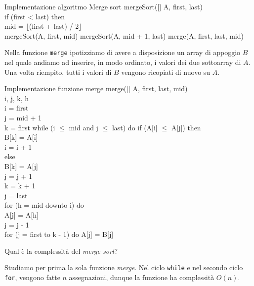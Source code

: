 \begin{code}{Implementazione algoritmo Merge sort}
\noindent\rmbreak\ind mergeSort([] A,  first,  last)\\
    if (first < last) then\\
        \indf{} mid = $\lfloor$(first + last) / 2$\rfloor$\\
        mergeSort(A, first, mid)\hfill{}
        mergeSort(A, mid + 1, last)\hfill{}
        merge(A, first, last, mid)\hfill{}
\end{code}\noindent
Nella funzione \texttt{merge} ipotizziamo di avere a disposizione un array di
appoggio $B$ nel quale andiamo ad inserire, in modo ordinato, i valori dei due
sottoarray di $A$. Una volta riempito, tutti i valori di $B$ vengono ricopiati
di nuovo su $A$.
\begin{code}{Implementazione funzione merge}
\noindent\rmbreak\ind merge([] A,  first,  last,  mid)\\
     i, j, k, h\\
    i = first\\
    j = mid + 1\\
    k = first\hfill{}
    while (i $\leq$ mid and j $\leq$ last) do\hfill{}
        \indf if (A[i] $\leq$ A[j]) then\\
            \indff B[k] = A[i]\\
            i = i + 1\\
        \indf else\\
            \indff B[k] = A[j]\\
            j = j + 1\\
        \indf k = k + 1\\
    \ind j = last\\
    for (h = mid downto i) do\\
        \indf A[j] = A[h]\\
        \indf j = j - 1\\
    \ind for (j = first to k - 1) do\hfill{}
        \indf A[j] = B[j]
\end{code}\noindent
Qual è la complessità del \emph{merge sort}?

\bigskip\noindent
Studiamo per prima la sola funzione \emph{merge}.
Nel ciclo \texttt{while} e nel secondo ciclo \texttt{for}, vengono fatte $n$
assegnazioni, dunque la funzione ha complessità $O(n)$.

